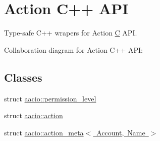\hypertarget{group__actioncppapi}{}\section{Action C++ A\+PI}
\label{group__actioncppapi}


Type-\/safe C++ wrapers for Action \mbox{\hyperlink{struct_c}{C}} A\+PI.  


Collaboration diagram for Action C++ A\+PI\+:
\subsection*{Classes}
\begin{DoxyCompactItemize}
\item 
struct \mbox{\hyperlink{structaacio_1_1permission__level}{aacio\+::permission\+\_\+level}}
\item 
struct \mbox{\hyperlink{structaacio_1_1action}{aacio\+::action}}
\item 
struct \mbox{\hyperlink{structaacio_1_1action__meta}{aacio\+::action\+\_\+meta$<$ Account, Name $>$}}
\end{DoxyCompactItemize}
